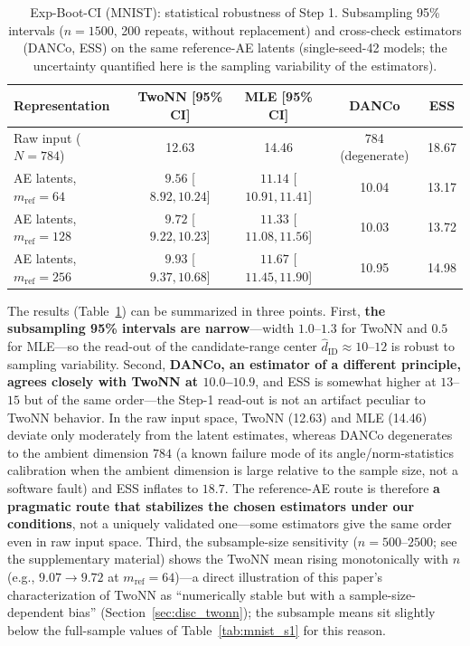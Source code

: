 \documentclass[make,article,submit,pdftex,moreauthors]{Definitions/mdpi}
\newcommand{\hatdID}{\hat{d}_{\mathrm{ID}}}
\begin{document}
\begin{table}[H]
\caption{Exp-Boot-CI (MNIST): statistical robustness of Step 1.
Subsampling 95\% intervals ($n = 1500$, 200 repeats, without replacement)
and cross-check estimators (DANCo, ESS) on the same reference-AE latents
(single-seed-42 models; the uncertainty quantified here is the sampling
variability of the estimators).}
\label{tab:boot_ci}
\small
\begin{tabular}{lcccc}
\toprule
\textbf{Representation} & \textbf{TwoNN [95\% CI]} & \textbf{MLE [95\% CI]} & \textbf{DANCo} & \textbf{ESS} \\
\midrule
Raw input ($N = 784$) & 12.63 & 14.46 & 784 (degenerate) & 18.67 \\
\midrule
AE latents, $m_{\mathrm{ref}} = 64$  & $9.56$ [$8.92, 10.24$] & $11.14$ [$10.91, 11.41$] & 10.04 & 13.17 \\
AE latents, $m_{\mathrm{ref}} = 128$ & $9.72$ [$9.22, 10.23$] & $11.33$ [$11.08, 11.56$] & 10.03 & 13.72 \\
AE latents, $m_{\mathrm{ref}} = 256$ & $9.93$ [$9.37, 10.68$] & $11.67$ [$11.45, 11.90$] & 10.95 & 14.98 \\
\bottomrule
\end{tabular}
\end{table}

The results (Table~\ref{tab:boot_ci}) can be summarized in three points.
First, \textbf{the subsampling 95\% intervals are narrow}---width
$1.0$--$1.3$ for TwoNN and $0.5$ for MLE---so the read-out of the
candidate-range center $\hatdID \approx 10$--$12$ is robust to sampling
variability.
Second, \textbf{DANCo, an estimator of a different principle, agrees
closely with TwoNN at $10.0$--$10.9$}, and ESS is somewhat higher at
$13$--$15$ but of the same order---the Step-1 read-out is not an artifact
peculiar to TwoNN behavior.
In the raw input space, TwoNN (12.63) and MLE (14.46) deviate only
moderately from the latent estimates, whereas DANCo degenerates to the
ambient dimension $784$ (a known failure mode of its angle/norm-statistics
calibration when the ambient dimension is large relative to the sample
size, not a software fault) and ESS inflates to $18.7$.
The reference-AE route is therefore \textbf{a pragmatic route that
stabilizes the chosen estimators under our conditions}, not a uniquely
validated one---some estimators give the same order even in raw input
space.
Third, the subsample-size sensitivity ($n = 500$--$2500$; see the
supplementary material) shows the TwoNN mean rising monotonically with $n$
(e.g., $9.07 \to 9.72$ at $m_{\mathrm{ref}} = 64$)---a direct illustration
of this paper's characterization of TwoNN as ``numerically stable but with
a sample-size-dependent bias'' (Section~\ref{sec:disc_twonn}); the
subsample means sit slightly below the full-sample values of
Table~\ref{tab:mnist_s1} for this reason.
\end{document}
